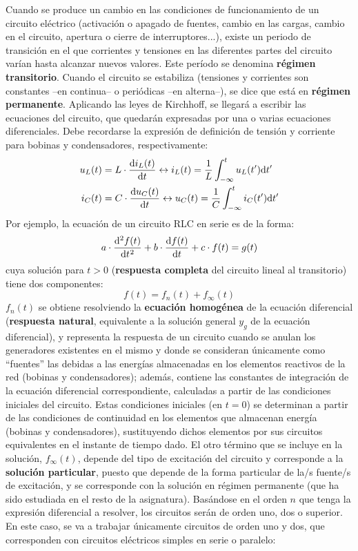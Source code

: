 \documentclass[11pt]{book} %
\begin{document}
	Cuando se produce un cambio en las condiciones de funcionamiento de un circuito eléctrico (activación o apagado de fuentes, cambio en las cargas, cambio en el circuito, apertura o cierre de interruptores...), existe un periodo de transición en el que corrientes y tensiones en las diferentes partes del circuito varían hasta alcanzar nuevos valores. Este período se denomina \textbf{régimen transitorio}. Cuando el circuito se estabiliza (tensiones y corrientes son constantes --en continua-- o periódicas --en alterna--), se dice que está en \textbf{régimen permanente}. Aplicando las leyes de Kirchhoff, se llegará a escribir las ecuaciones del circuito, que quedarán expresadas por una o varias ecuaciones diferenciales. Debe recordarse la expresión de definición de tensión y corriente para bobinas y condensadores, respectivamente:
	\begin{align*}
	    u_L(t) &= L \cdot \diff{i_L(t)}{t}
          \leftrightarrow
          i_L(t) = \frac{1}{L} \int^t_{-\infty}u_L(t') \mathrm{d}t'\\
          i_C(t) &= C \cdot \diff{u_C(t)}{t}
          \leftrightarrow
          u_C(t) = \frac{1}{C} \int^t_{-\infty}i_C(t') \mathrm{d}t'
	\end{align*}
	Por ejemplo, la ecuación de un circuito RLC en serie es de la forma:
\begin{equation*}
    a \cdot \diff[2]{f(t)}{t} + b \cdot \diff{f(t)}{t} + c \cdot f(t) = g(t)
\end{equation*}
cuya solución para $t > 0$ (\textbf{respuesta completa} del circuito lineal al transitorio) tiene dos componentes:
\begin{equation*}
    f(t) = f_n(t) + f_\infty(t)
\end{equation*}
$f_n(t)$ se obtiene resolviendo la \textbf{ecuación homogénea} de la ecuación diferencial (\textbf{respuesta natural}, equivalente a la solución general $y_g$ de la ecuación diferencial), y representa la respuesta de un circuito cuando se anulan los generadores existentes en el mismo y donde se consideran únicamente como ``fuentes'' las debidas a las energías almacenadas en los elementos reactivos de la red (bobinas y condensadores); además, contiene las constantes de integración de la ecuación diferencial correspondiente, calculadas a partir de las condiciones iniciales del circuito. Estas condiciones iniciales (en $t=0$) se determinan a partir de las condiciones de continuidad en los elementos que almacenan energía (bobinas y condensadores), sustituyendo dichos elementos por sus circuitos equivalentes en el instante de tiempo dado. El otro término que se incluye en la solución, $f_\infty(t)$, depende del tipo de excitación del circuito y corresponde a la \textbf{solución particular}, puesto que depende de la forma particular de la/s fuente/s de excitación, y se corresponde con la solución en régimen permanente (que ha sido estudiada en el resto de la asignatura). Basándose en el orden $n$ que tenga la expresión diferencial a resolver, los circuitos serán de orden uno, dos o superior. En este caso, se va a trabajar únicamente circuitos de orden uno y dos, que corresponden con circuitos eléctricos simples en serie o paralelo:
\end{document}

